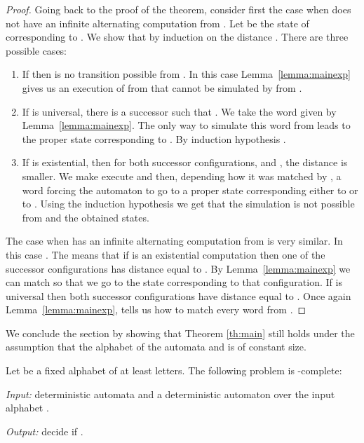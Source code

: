 \documentclass{LMCS}
\theoremstyle{plain}\newtheorem{remark}{Remark}
\theoremstyle{plain}\newtheorem{lemma}[thm]{Lemma}
\begin{document}
\begin{proof}
  Going back to the proof of the theorem, consider first the case when
   does not have an infinite alternating computation from . Let
   be the state of  corresponding to .  We show that
   by induction on the distance . There are
  three possible cases:
  \begin{enumerate}[]
  \item If  then is no transition possible from . In this case 
    Lemma~\ref{lemma:mainexp} gives us an execution of  from  that
    cannot be simulated by  from .
  \item If  is universal, there is a successor  such that
    . We take the word  given by
    Lemma~\ref{lemma:mainexp}. The only way to simulate this word from
     leads to the proper state  corresponding to
    . By induction hypothesis .
  \item If  is existential, then for both successor configurations,
     and , the distance is smaller. We make  execute
     and then, depending how it was matched by  , a
    word forcing the automaton to go to a proper state corresponding
    either to  or to . Using the induction hypothesis we get that
    the simulation is not possible from  and the obtained states.
  \end{enumerate}

  The case when  has an infinite alternating computation from 
  is very similar. In this case . The means that if  is
  an existential computation then one of the successor configurations
  has distance equal to . By Lemma~\ref{lemma:mainexp} we can
  match  so that we go to the state corresponding to that
  configuration. If  is universal then both successor
  configurations have distance equal to . Once again
  Lemma~\ref{lemma:mainexp}, tells us how to match every word from
  .
\end{proof}

We conclude the section by showing that Theorem \ref{th:main} still
holds under the assumption that the alphabet of the automata 
and  is of
constant size.

\begin{thm} \label{th:mainc} Let  be a fixed alphabet of at
  least  letters. The following problem is \EXPTIME-complete:

\emph{Input:} deterministic automata
  and a deterministic automaton  over
the input alphabet .

\emph{Output:} decide if
.

\end{thm}
\end{document}
